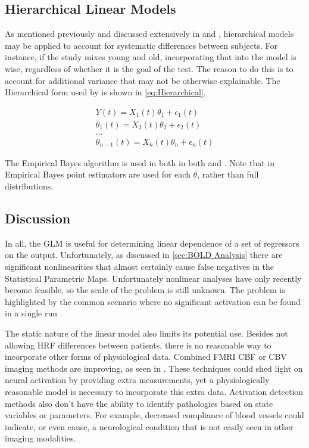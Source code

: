 \subsection{Hierarchical Linear Models}
As mentioned previously and discussed extensively
in \cite{Friston2002} and \cite{Hofmann1997}, hierarchical models may be 
applied to account for systematic differences between subjects. For instance, if the
study mixes young and old, incorporating
that into the model is wise, regardless of whether it is the goal of the test. 
The reason to do this is to account for additional variance that may not
be otherwise explainable.  The Hierarchical form used by
\cite{Friston2002} is shown in \autoref{eq:Hierarchical}.

\begin{eqnarray}
\label{eq:Hierarchical}
Y(t) = X_1(t)\theta_1 + \epsilon_1(t)            \nonumber \\
\theta_1(t) = X_2(t)\theta_2 + \epsilon_2(t)     \nonumber \\
...                                              \nonumber \\
\theta_{n-1}(t) = X_n(t)\theta_n + \epsilon_n(t) 
\end{eqnarray}

The Empirical Bayes algorithm is used in both in both \cite{Friston2002} 
and \cite{Hofmann1997}. Note that in Empirical Bayes point estimators 
are used for each $\theta$, rather than full distributions.

\subsection{Discussion}
\label{sec:BackgroundConclusion}
In all, the GLM is useful for determining linear 
dependence of a set of regressors on the output. Unfortunately, as discussed in
\autoref{sec:BOLD Analysis} there are significant nonlinearities 
that almost certainly cause false negatives in the Statistical Parametric
Maps. Unfortunately nonlinear analyses have only recently become feasible,
so the scale of the problem is still unknown. The problem is 
highlighted by the common scenario where no significant
activation can be found in a single run \cite{Riera2004}
\cite{Johnston2008}.  

The static nature of the  linear model also limits its potential use. 
Besides not allowing HRF differences between patients, there is no
reasonable way to incorporate other forms of physiological
data. Combined FMRI CBF or CBV imaging methods are improving,
as seen in \cite{Chen2009}. These techniques could shed light on
neural activation by providing extra measurements, yet a 
physiologically reasonable model is necessary to incorporate this extra data.
Activation detection methods also don't have the ability 
to identify pathologies based on state variables or parameters. For
example, decreased compliance of
blood vessels could indicate, or even cause, a neurological condition that 
is not easily seen in other imaging modalities. 

